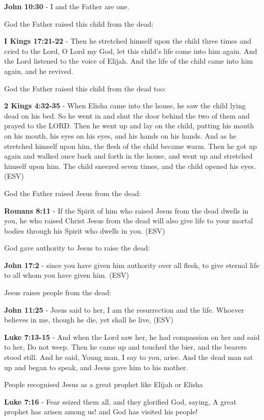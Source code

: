 \documentclass[11pt]{article}
\begin{document}
\textbf{John 10:30} - I and the Father are one.

God the Father raised this child from the dead:

\textbf{I Kings 17:21-22} - Then he stretched himself upon the child three times and cried to the Lord, O Lord my God, let this child's life come into him again. And the Lord listened to the voice of Elijah. And the life of the child came into him again, and he revived.

God the Father raised this child from the dead too:

\textbf{2 Kings 4:32-35} -  When Elisha came into the house, he saw the child lying dead on his bed.  So he went in and shut the door behind the two of them and prayed to the LORD.  Then he went up and lay on the child, putting his mouth on his mouth, his eyes on his eyes, and his hands on his hands.  And as he stretched himself upon him, the flesh of the child became warm.  Then he got up again and walked once back and forth in the house, and went up and stretched himself upon him. The child sneezed seven times, and the child opened his eyes.  (ESV)

God the Father raised Jesus from the dead:

\textbf{Romans 8:11} - If the Spirit of him who raised Jesus from the dead dwells in you, he who raised Christ Jesus from the dead will also give life to your mortal bodies through his Spirit who dwells in you. (ESV)

God gave authority to Jesus to raise the dead:

\textbf{John 17:2} - since you have given him authority over all flesh, to give eternal life to all whom you have given him. (ESV)

Jesus raises people from the dead:

\textbf{John 11:25} - Jesus said to her, I am the resurrection and the life. Whoever believes in me, though he die, yet shall he live, (ESV)

\textbf{Luke 7:13-15} - And when the Lord saw her, he had compassion on her and said to her, Do not weep. Then he came up and touched the bier, and the bearers stood still. And he said, Young man, I say to you, arise. And the dead man sat up and began to speak, and Jesus gave him to his mother.

People recognised Jesus as a great prophet like Elijah or Elisha

\textbf{Luke 7:16} - Fear seized them all, and they glorified God, saying, A great prophet has arisen among us! and God has visited his people!
\end{document}
